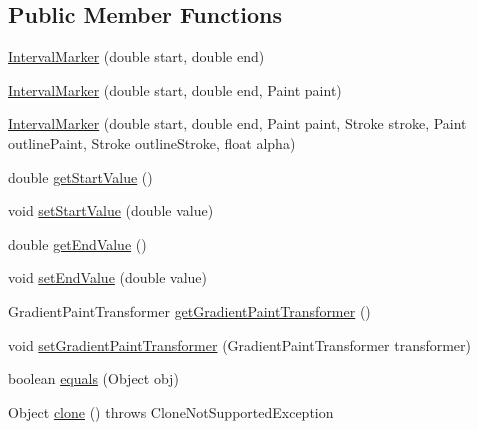 \subsection*{Public Member Functions}
\begin{DoxyCompactItemize}
\item 
\mbox{\hyperlink{classorg_1_1jfree_1_1chart_1_1plot_1_1_interval_marker_a9017f8084188028a48d4f54ade8f3f74}{Interval\+Marker}} (double start, double end)
\item 
\mbox{\hyperlink{classorg_1_1jfree_1_1chart_1_1plot_1_1_interval_marker_a33af88359b1e185ce57922b2a4968829}{Interval\+Marker}} (double start, double end, Paint paint)
\item 
\mbox{\hyperlink{classorg_1_1jfree_1_1chart_1_1plot_1_1_interval_marker_a3717bcadd9004aad87b3189778fe9b0e}{Interval\+Marker}} (double start, double end, Paint paint, Stroke stroke, Paint outline\+Paint, Stroke outline\+Stroke, float alpha)
\item 
double \mbox{\hyperlink{classorg_1_1jfree_1_1chart_1_1plot_1_1_interval_marker_ab5420c80bec65dbc6a29ca4676ac4d02}{get\+Start\+Value}} ()
\item 
void \mbox{\hyperlink{classorg_1_1jfree_1_1chart_1_1plot_1_1_interval_marker_a12b1e366da338c7680d52214d62393c8}{set\+Start\+Value}} (double value)
\item 
double \mbox{\hyperlink{classorg_1_1jfree_1_1chart_1_1plot_1_1_interval_marker_ac912d87dee188f8196de6ad732cc9601}{get\+End\+Value}} ()
\item 
void \mbox{\hyperlink{classorg_1_1jfree_1_1chart_1_1plot_1_1_interval_marker_ae944891070e96e056355eb84354ceec4}{set\+End\+Value}} (double value)
\item 
Gradient\+Paint\+Transformer \mbox{\hyperlink{classorg_1_1jfree_1_1chart_1_1plot_1_1_interval_marker_afffffb49b6fda83b4c3b93bbf3ac29d9}{get\+Gradient\+Paint\+Transformer}} ()
\item 
void \mbox{\hyperlink{classorg_1_1jfree_1_1chart_1_1plot_1_1_interval_marker_a706ae116c879dfeb53f7a2927312cf81}{set\+Gradient\+Paint\+Transformer}} (Gradient\+Paint\+Transformer transformer)
\item 
boolean \mbox{\hyperlink{classorg_1_1jfree_1_1chart_1_1plot_1_1_interval_marker_ae7a30bf4ac58683a2408fd4991f9ff98}{equals}} (Object obj)
\item 
Object \mbox{\hyperlink{classorg_1_1jfree_1_1chart_1_1plot_1_1_interval_marker_a5424b6ad358e7c07f19884e541e3fe3a}{clone}} ()  throws Clone\+Not\+Supported\+Exception 
\end{DoxyCompactItemize}
